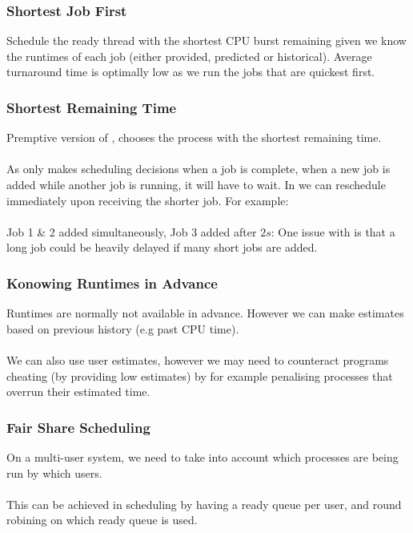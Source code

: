 \documentclass{report}
\begin{document}
\subsubsection*{Shortest Job First}
Schedule the ready thread with the shortest CPU burst remaining given we know the runtimes of each job (either provided, predicted or historical).
Average turnaround time is optimally low as we run the jobs that are quickest first.
\subsubsection*{Shortest Remaining Time}
Premptive version of , chooses the process with the shortest remaining time.
\\
\\ As  only makes scheduling decisions when a job is complete, when a new job is added while another job is running, it will have to wait. In  we can reschedule immediately upon receiving the shorter job. For example:
\\
\\ Job 1 \& 2 added simultaneously, Job 3 added after $2s$:
One issue with  is that a long job could be heavily delayed if many short jobs are added.
\subsubsection*{Konowing Runtimes in Advance}
Runtimes are normally not available in advance. However we can make estimates based on previous history (e.g past CPU time).
\\
\\ We can also use user estimates, however we may need to counteract programs cheating (by providing low estimates) by for example penalising processes that overrun their estimated time.
\subsubsection*{Fair Share Scheduling}
On a multi-user system, we need to take into account which processes are being run by which users.
\\
\\ This can be achieved in  scheduling by having a ready queue per user, and round robining on which ready queue is used.
\end{document}
